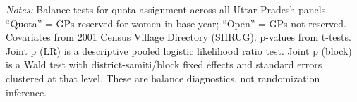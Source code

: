 \begin{table}[htbp]
\vspace{0.5ex}
\parbox{\linewidth}{\scriptsize \emph{Notes:} Balance tests for quota assignment across all Uttar Pradesh panels. ``Quota'' = GPs reserved for women in base year; ``Open'' = GPs not reserved. Covariates from 2001 Census Village Directory (SHRUG). p-values from t-tests. Joint p (LR) is a descriptive pooled logistic likelihood ratio test. Joint p (block) is a Wald test with district-samiti/block fixed effects and standard errors clustered at that level. These are balance diagnostics, not randomization inference.}
\end{table}
